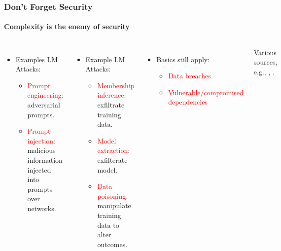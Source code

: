 \documentclass[11pt,
               aspectratio=169,
               hyperref={colorlinks}
               ]{beamer}
\begin{document}
		\begin{frame}
			
			\frametitle{Don't Forget Security}
			\framesubtitle{Complexity is the enemy of security}
			
			\begin{columns}
				\vspace{-5pt}
				\begin{itemize}
				\item Examples LM Attacks:
					\begin{itemize}
						\item \textcolor{red}{Prompt engineering}: adversarial prompts.
						\item \textcolor{red}{Prompt injection}: malicious information injected into prompts over networks.
					\end{itemize}
				\end{itemize}

				\begin{itemize}
				\item Example LM Attacks:
					\begin{itemize}
						\item \textcolor{red}{Membership inference}: exfiltrate training data.
						\item \textcolor{red}{Model extraction}: exfilterate model.
						\item \textcolor{red}{Data poisoning}: manipulate training data to alter outcomes.
					\end{itemize}
				\end{itemize}

				\begin{itemize}				
				\item Basics still apply:
					\begin{itemize}
						\item \textcolor{red}{Data breaches}
						\item \textcolor{red}{Vulnerable/compromised dependencies}
					\end{itemize}
				\end{itemize}
				\vspace{5pt}
			    \hspace{12pt}\tiny{Various sources, e.g., \cite{Adversa}, \cite{prompt_injection}.}
			

\end{columns}
\end{frame}
\end{document}
